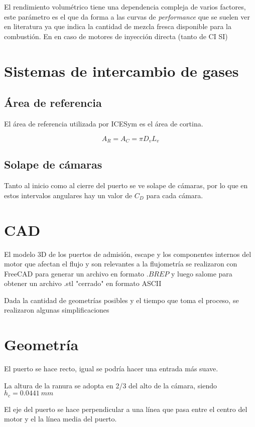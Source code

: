 El rendimiento volumétrico tiene una dependencia compleja de varios factores,
este parámetro es el que da forma a las curvas de \emph{performance} que se
suelen ver en literatura ya que indica la cantidad de mezcla fresca disponible
para la combustión. 
%
En en caso de motores de inyección directa (tanto de CI SI)

\section{Sistemas de intercambio de gases}
%
\subsection{Área de referencia}
%
El área de referencia utilizada por ICESym es el área de cortina.

$$ A_R = A_C = \pi D_v L_v $$

\subsection{Solape de cámaras}
%
Tanto al inicio como al cierre del puerto se ve solape de cámaras, por lo que
en estos intervalos angulares hay un valor de $C_D$ para cada cámara.

\section{CAD}
%
El modelo 3D de los puertos de admisión, escape y los componentes internos del
motor que afectan el flujo y son relevantes a la flujometría se realizaron con
FreeCAD\cite{freecad} para generar un archivo en formato $.BREP$ y luego
salome\cite{salome} para obtener un archivo .stl "cerrado" en formato ASCII

Dada la cantidad de geometrías posibles y el tiempo que toma el proceso, se
realizaron algunas simplificaciones

\section{Geometría}
%
El puerto se hace recto, igual se podría hacer una entrada más suave.

La altura de la ranura se adopta en 2/3 del alto de la cámara, siendo $h_c=0.0441\ mm$

El eje del puerto se hace perpendicular a una línea que pasa entre el centro
del motor y el la línea media del puerto.


